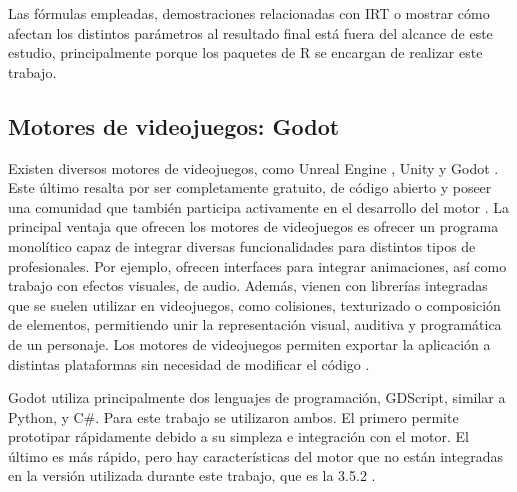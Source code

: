 Las fórmulas empleadas, demostraciones relacionadas con IRT o mostrar cómo afectan los distintos parámetros al resultado final está fuera del alcance de este estudio, principalmente porque los paquetes de R se encargan de realizar este trabajo.

\subsection{Motores de videojuegos: Godot}

Existen diversos motores de videojuegos, como Unreal Engine \cite{UE}, Unity \cite{Unity} y Godot \cite{Godot}. Este último resalta por ser completamente gratuito, de código abierto y poseer una comunidad que también participa activamente en el desarrollo del motor \cite{GodotGithubRepository}. La principal ventaja que ofrecen los motores de videojuegos es ofrecer un programa monolítico capaz de integrar diversas funcionalidades para distintos tipos de profesionales. Por ejemplo, ofrecen interfaces para integrar animaciones, así como trabajo con efectos visuales, de audio. Además, vienen con librerías integradas que se suelen utilizar en videojuegos, como colisiones, texturizado o composición de elementos, permitiendo unir la representación visual, auditiva y programática de un personaje. Los motores de videojuegos permiten exportar la aplicación a distintas plataformas sin necesidad de modificar el código \cite{GodotExport}.

Godot utiliza principalmente dos lenguajes de programación, GDScript, similar a Python, y C#. Para este trabajo se utilizaron ambos. El primero permite prototipar rápidamente debido a su simpleza e integración con el motor. El último es más rápido, pero hay características del motor que no están integradas en la versión utilizada durante este trabajo, que es la 3.5.2 \cite{GodotCSharpGDDifferences}.

